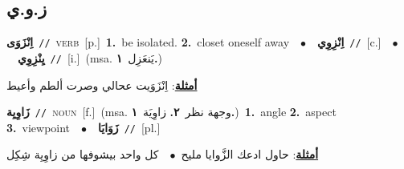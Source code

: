 \documentclass[10pt,a4paper,twoside]{article} %
\begin{document}
\begin{multicols}{2}
\vspace{-3mm}
\subsection*{\color{blue}\foreignlanguage{arabic}{ز.و.ي}\color{blue}{}} 

{\setlength\topsep{0pt}\textbf{\foreignlanguage{arabic}{اِنْزَوَى}}\ {\color{gray}\texttt{//}\color{black}}\ \textsc{verb}\ [p.]\ \textbf{1.}~be isolated.  \textbf{2.}~closet oneself away\ \ $\bullet$\ \ \setlength\topsep{0pt}\textbf{\foreignlanguage{arabic}{اِنْزِوِي}}\ {\color{gray}\texttt{//}\color{black}}\ [c.]\ \ $\bullet$\ \ \setlength\topsep{0pt}\textbf{\foreignlanguage{arabic}{يِنْزِوِي}}\ {\color{gray}\texttt{//}\color{black}}\ [i.]\ \color{gray}(msa. \foreignlanguage{arabic}{يَنعَزِل}~\foreignlanguage{arabic}{\textbf{١.}})\color{black}\  \begin{flushright}\color{gray}\foreignlanguage{arabic}{\textbf{\underline{\foreignlanguage{arabic}{أمثلة}}}: اِنْزَوَيت عحالي وصرت ألطم وأعيط}\end{flushright}\color{black}} \vspace{2mm}

{\setlength\topsep{0pt}\textbf{\foreignlanguage{arabic}{زَاوِيِة}}\ {\color{gray}\texttt{//}\color{black}}\ \textsc{noun}\ [f.]\ \color{gray}(msa. \foreignlanguage{arabic}{وجهة نظر}~\foreignlanguage{arabic}{\textbf{٢.}}  \foreignlanguage{arabic}{زاوِيَة}~\foreignlanguage{arabic}{\textbf{١.}})\color{black}\ \textbf{1.}~angle  \textbf{2.}~aspect  \textbf{3.}~viewpoint\ \ $\bullet$\ \ \setlength\topsep{0pt}\textbf{\foreignlanguage{arabic}{زَوَايَا}}\ {\color{gray}\texttt{//}\color{black}}\ [pl.]\  \begin{flushright}\color{gray}\foreignlanguage{arabic}{\textbf{\underline{\foreignlanguage{arabic}{أمثلة}}}: حاول ادعك الزَّوايا مليح\ $\bullet$\ \  كل واحد بيشوفها من زاوِيِة شِكِل}\end{flushright}\color{black}} \vspace{2mm}


\end{multicols}
\end{document}
